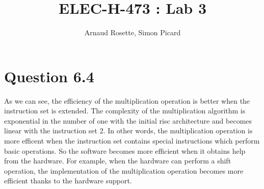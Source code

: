 \documentclass[a4paper,10pt]{article}
\title{ELEC-H-473 : Lab 3}
\author{Arnaud Rosette, Simon Picard}
\begin{document}
\maketitle
\section{Question 6.4}
As we can see, the efficiency of the multiplication operation is better when the instruction set is extended. 
The complexity of the multiplication algorithm is exponential in the number of one with the initial risc architecture and becomes linear with the instruction set 2.
In other words, the multiplication operation is more efficent when the instruction set contains special instructions which perform basic operations.
So the software becomes more efficient when it obtains help from the hardware. For example, when the hardware can perform a shift operation, the implementation of the multiplication operation becomes more efficient thanks to the hardware support.
\end{document}
